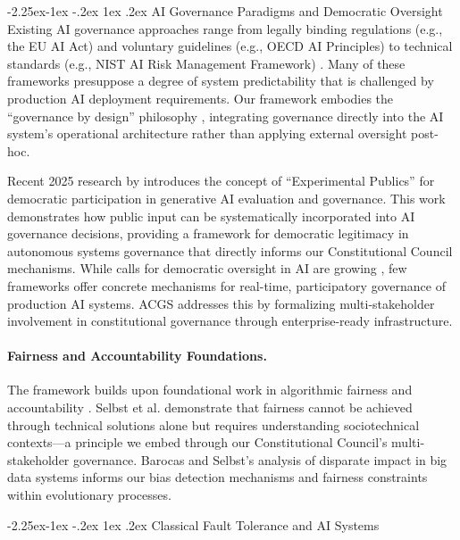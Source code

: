 \documentclass[manuscript,screen,9pt]{acmart}
\makeatletter
\renewcommand\subsection{\@startsection{subsection}{2}{\z@}%
  {-2.25ex\@plus -1ex \@minus -.2ex}%
  {1ex \@plus .2ex}%
  {\normalfont\large\bfseries}}
\makeatother
\begin{document}
\begin{table}[!htb]
\subsection{AI Governance Paradigms and Democratic Oversight}
Existing AI governance approaches range from legally binding regulations (e.g., the EU AI Act) and voluntary guidelines (e.g., OECD AI Principles) to technical standards (e.g., NIST AI Risk Management Framework) \cite{Wynants2025ETHICAL, WorldBank2024AIGovernance, CambridgeUP2024CorporateGovernance}. Many of these frameworks presuppose a degree of system predictability that is challenged by production AI deployment requirements. Our framework embodies the ``governance by design'' philosophy \cite{Engin2025AdaptiveAIGovernance}, integrating governance directly into the AI system's operational architecture rather than applying external oversight post-hoc.

Recent 2025 research by \citet{Knight2025ExperimentalPublics} introduces the concept of ``Experimental Publics'' for democratic participation in generative AI evaluation and governance. This work demonstrates how public input can be systematically incorporated into AI governance decisions, providing a framework for democratic legitimacy in autonomous systems governance that directly informs our Constitutional Council mechanisms. While calls for democratic oversight in AI are growing \cite{Hwang2025PublicCAI}, few frameworks offer concrete mechanisms for real-time, participatory governance of production AI systems. ACGS addresses this by formalizing multi-stakeholder involvement in constitutional governance through enterprise-ready infrastructure.

\paragraph{Fairness and Accountability Foundations.} The framework builds upon foundational work in algorithmic fairness and accountability \cite{Selbst2019FairnessAccountability, Barocas2016BigDataDisparate}. Selbst et al. demonstrate that fairness cannot be achieved through technical solutions alone but requires understanding sociotechnical contexts---a principle we embed through our Constitutional Council's multi-stakeholder governance. Barocas and Selbst's analysis of disparate impact in big data systems informs our bias detection mechanisms and fairness constraints within evolutionary processes.

\subsection{Classical Fault Tolerance and AI Systems}
\label{subsec:classical_fault_tolerance}


\end{table}
\end{document}
